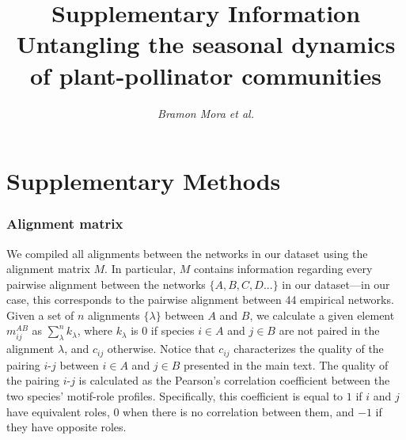 \documentclass[11pt, a4paper]{article}
\title{\vspace{-1cm} \normalsize Supplementary Information\\\vspace{0.2cm}
\LARGE Untangling the seasonal dynamics of plant-pollinator communities}
\author{\textit{Bramon Mora et al.}}
\date{}
\begin{document}
\maketitle
\thispagestyle{empty}

\clearpage

\section*{Supplementary Methods}

\subsubsection*{Alignment matrix}
We compiled all alignments between the networks in our dataset using the alignment matrix $M$. In particular, $M$ contains information regarding every pairwise alignment between the networks $\{A,B,C,D...\}$ in our dataset---in our case, this corresponds to the pairwise alignment between 44 empirical networks. Given a set of $n$ alignments $\{\lambda\}$ between $A$ and $B$, we calculate a given element $m^{AB}_{ij}$ as $\sum^{n}_{\lambda} k_{\lambda}$, where $k_{\lambda}$ is 0 if species $i\in A$ and $j\in B$ are not paired in the alignment $\lambda$, and $c_{ij}$ otherwise. Notice that $c_{ij}$ characterizes the quality of the pairing $i$-$j$ between $i\in A$ and $j\in B$ presented in the main text. The quality of the pairing $i$-$j$ is calculated as the Pearson's correlation coefficient between the two species' motif-role profiles\citep{mora2018identifying}. Specifically, this coefficient is equal to $1$ if $i$ and $j$ have equivalent roles, $0$ when there is no correlation between them, and $-1$ if they have opposite roles.
\end{document}
